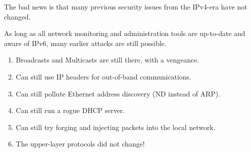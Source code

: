The bad news is that many previous security issues from the IPv4-era have not changed. 

As long as all network monitoring and administration tools are up-to-date and aware of IPv6, many earlier attacks are still possible.

\begin {enumerate}

\item Broadcasts and Multicasts are still there, with a vengeance.
\item Can still use IP headers for out-of-band communications.
\item Can still pollute Ethernet address discovery (ND instead of ARP).
\item Can still run a rogue DHCP server.
\item Can still try forging and injecting packets into the local network. 
\item The upper-layer protocols did not change!

\end {enumerate}




